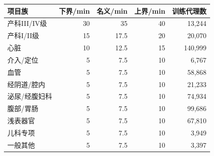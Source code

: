 \begin{tabular}{lrrrr}
\toprule
项目族 & 下界/min & 名义/min & 上界/min & 训练代理数 \\
\midrule
产科III/IV级 & 30 & 35 & 40 & 13,244 \\
产科I/II级 & 15 & 17.5 & 20 & 20,070 \\
心脏 & 10 & 12.5 & 15 & 140,999 \\
介入/定位 & 5 & 7.5 & 10 & 6,767 \\
血管 & 5 & 7.5 & 10 & 58,868 \\
经阴道/腔内 & 5 & 7.5 & 10 & 21,233 \\
泌尿/经腹妇科 & 5 & 7.5 & 10 & 74,934 \\
腹部/胃肠 & 5 & 7.5 & 10 & 99,686 \\
浅表器官 & 5 & 7.5 & 10 & 67,810 \\
儿科专项 & 5 & 7.5 & 10 & 3,949 \\
一般其他 & 5 & 7.5 & 10 & 3,397 \\
\bottomrule
\end{tabular}
